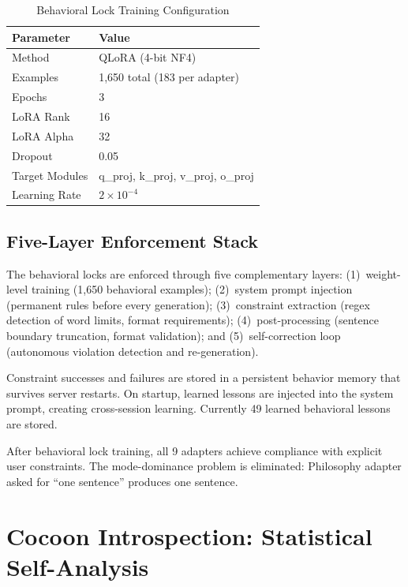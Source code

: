 \documentclass[11pt,a4paper]{article}
\begin{document}
\begin{table}[H]
\centering
\caption{Behavioral Lock Training Configuration}
\label{tab:lock-training}
\begin{tabular}{ll}
\toprule
\textbf{Parameter} & \textbf{Value} \\
\midrule
Method       & QLoRA (4-bit NF4) \\
Examples     & 1,650 total (183 per adapter) \\
Epochs       & 3 \\
LoRA Rank    & 16 \\
LoRA Alpha   & 32 \\
Dropout      & 0.05 \\
Target Modules & q\_proj, k\_proj, v\_proj, o\_proj \\
Learning Rate  & $2 \times 10^{-4}$ \\
\bottomrule
\end{tabular}
\end{table}

\subsection{Five-Layer Enforcement Stack}

The behavioral locks are enforced through five complementary layers:
(1)~weight-level training (1,650 behavioral examples);
(2)~system prompt injection (permanent rules before every generation);
(3)~constraint extraction (regex detection of word limits, format requirements);
(4)~post-processing (sentence boundary truncation, format validation); and
(5)~self-correction loop (autonomous violation detection and re-generation).

Constraint successes and failures are stored in a persistent behavior memory
that survives server restarts. On startup, learned lessons are injected into
the system prompt, creating cross-session learning. Currently 49 learned
behavioral lessons are stored.

After behavioral lock training, all 9 adapters achieve compliance with
explicit user constraints. The mode-dominance problem is eliminated:
Philosophy adapter asked for ``one sentence'' produces one sentence.

\section{Cocoon Introspection: Statistical Self-Analysis}
\label{sec:introspection}
\end{document}
